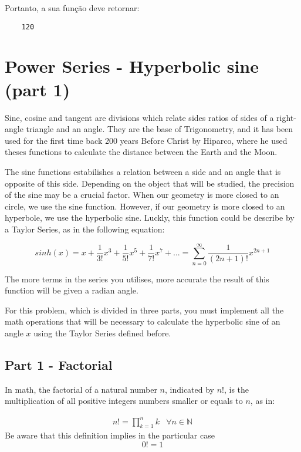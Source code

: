 Portanto, a sua função deve retornar:
\begin{lstlisting}
	120
\end{lstlisting}

\newpage

\section{Power Series - Hyperbolic sine (part 1)}
Sine, cosine and tangent are divisions which relate sides ratios of sides of a right-angle triangle and an angle. They are the base of Trigonometry, and it has been used for the first time back 200 years Before Christ by Hiparco, where he used theses functions to calculate the distance between the Earth and the Moon. 

The sine functions estabilishes a relation between a side and an angle that is opposite of this side. Depending on the object that will be studied, the precision of the sine may be a crucial factor. When our geometry is more closed to an circle, we use the sine function. However, if our geometry is more closed to an hyperbole, we use the hyperbolic sine. Luckly, this function could be describe by a Taylor Series, as in the following equation:

\begin{equation*}
	sinh(x) = x + \frac{1}{3!}x^3 + \frac{1}{5!}x^5+\frac{1}{7!}x^7+...=\sum_{n = 0}^{\infty }\frac{1}{(2n + 1)!}x^{2n + 1}
\end{equation*}

The more terms in the series you utilises, more accurate the result of this function will be given a radian angle.


For this problem, which is divided in three parts, you must implement all the math operations that will be necessary to calculate the hyperbolic sine of an angle $x$ using the Taylor Series defined before.

\subsection*{Part 1 - Factorial}
In math, the factorial of a natural number $n$, indicated by $n!$, is the multiplication of all positive integers numbers smaller or equals to $n$, as in:

\begin{equation*}
	\begin{matrix}
		n! = \prod_{k=1}^{n}k  & \forall n\in\mathbb{N}
	\end{matrix}
\end{equation*}
Be aware that this definition implies in the particular case
\begin{equation*}
	0! = 1
\end{equation*}

